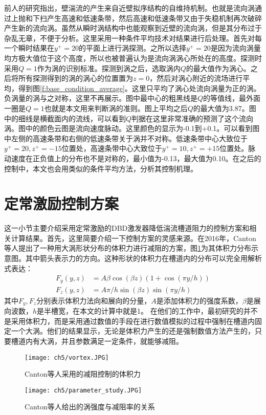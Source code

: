 前人的研究\cite{Hamilton1995}指出，壁湍流的产生来自近壁拟序结构的自维持机制。也就是流向涡通过上抛和下扫产生高速和低速条带，然后高速和低速条带又由于失稳机制再次破碎产生新的流向涡。虽然从瞬时涡结构中也能观察到近壁的流向涡，但是其分布过于杂乱无章，不便于分析。这里采用一种条件平均技术对结果进行后处理。首先对每一个瞬时结果在$y^+=20$的平面上进行涡探测。之所以选择$y^+=20$是因为流向涡量均方极大值位于这个高度\cite{Jeong1997}，所以也被普遍认为是流向涡涡心所处在的高度。探测时采用$Q=1$作为涡的识别标准。探测到涡之后，选取涡内$Q$的最大值作为涡心。之后将所有探测得到的涡的涡心的位置置为$z=0$，然后对涡心附近的流场进行平均，得到图\ref{f:base_condition_average}。这里只平均了涡心处流向涡量为正的涡。负涡量的涡与之对称，这里不再展示。图中最中心的粗黑线是$Q$的等值线，最外面一圈是$Q=1$也就是本文用来判断涡的准则。图上平均之后$Q$的最大值为3.87。图中的细线是横截面内的流线，可以看到$Q$判据在这里非常准确的预测了这个流向涡。图中的颜色云图是流向速度脉动。这里颜色的显示为-0.1到+0.1。可以看到图中左侧的高速条带和右侧的低速条带关于涡并不对称。低速条带中心大致位于$y^+=20,z^+=-15$位置处，高速条带中心大致位于$y^+=10,z^+=+15$位置处。脉动速度在正负值上的分布也不是对称的，最小值为-0.13，最大值为0.10。在之后的控制中，本文也会用类似的条件平均方法，分析其控制机理。

\section{定常激励控制方案}
这一小节主要介绍采用定常激励的DBD激发器降低湍流槽道阻力的控制方案和相关计算结果。首先，这里简要介绍一下控制方案的灵感来源。在2016年，Canton等人\cite{Canton2016}提出了一种用大涡形状分布的体积力进行减阻的方案，图\ref{f:vor_f}为其体积力分布示意图。其中箭头表示力的方向。这种形状的体积力在槽道内的分布可以完全用解析式表达：
\begin{subequations}\label{e:vvf_equations}
\begin{align}
  F_y \left( {y,z} \right) &= A\beta \cos \left( {\beta z} \right)\left( {1 + \cos \left( {\pi y/h} \right)} \right)\\
  F_z \left( {y,z} \right) &= A\pi /h\sin \left( {\beta z} \right)\sin \left( {\pi y/h} \right)
\end{align}
\end{subequations}
其中$F_y,F_z$分别表示体积力法向和展向的分量，$A$是添加体积力的强度系数，$\beta$是展向波数，$h$是半槽宽，在本文的计算中就是1。
在他们的工作中，最初研究的并不是采用体积力，而是采用通过数值的手段在进行数值模拟的过程中强制在槽道内固定一个大涡。他们的结果显示，无论是体积力产生的还是强制数值方法产生的，只要槽道内有大涡，并且参数满足一定条件，就能够减阻。
\begin{figure}[htb]
  \centering
  \texttt{[image: ch5/vortex.JPG]}
  \caption{Canton等人\cite{Canton2016}采用的减阻控制的体积力}\label{f:vor_f}
\end{figure}
\begin{figure}[htb]
  \centering
  \texttt{[image: ch5/parameter\_study.JPG]}
  \caption{Canton等人\cite{Canton2016}给出的涡强度与减阻率的关系}\label{f:vort_strength_vs_DR}
\end{figure}

